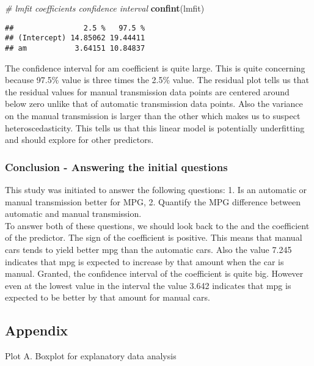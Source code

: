\documentclass[]{article}
\newenvironment{Shaded}{\begin{snugshade}}{\end{snugshade}}
\newcommand{\KeywordTok}[1]{\textcolor[rgb]{0.13,0.29,0.53}{\textbf{#1}}}
\newcommand{\CommentTok}[1]{\textcolor[rgb]{0.56,0.35,0.01}{\textit{#1}}}
\newcommand{\NormalTok}[1]{#1}
\begin{document}
\begin{Shaded}
\begin{Highlighting}[]
\CommentTok{# lmfit coefficients confidence interval}
\KeywordTok{confint}\NormalTok{(lmfit)}
\end{Highlighting}
\end{Shaded}

\begin{verbatim}
##                2.5 %   97.5 %
## (Intercept) 14.85062 19.44411
## am           3.64151 10.84837
\end{verbatim}

The confidence interval for am coefficient is quite large. This is quite
concerning because 97.5\% value is three times the 2.5\% value. The
residual plot tells us that the residual values for manual transmission
data points are centered around below zero unlike that of automatic
transmission data points. Also the variance on the manual transmission
is larger than the other which makes us to suspect heteroscedasticity.
This tells us that this linear model is potentially underfitting and
should explore for other predictors.

\subsubsection{Conclusion - Answering the initial
questions}\label{conclusion---answering-the-initial-questions}

This study was initiated to answer the following questions: 1. Is an
automatic or manual transmission better for MPG, 2. Quantify the MPG
difference between automatic and manual transmission.\\
To answer both of these questions, we should look back to the and the
coefficient of the predictor. The sign of the coefficient is positive.
This means that manual cars tends to yield better mpg than the automatic
cars. Also the value 7.245 indicates that mpg is expected to increase by
that amount when the car is manual. Granted, the confidence interval of
the coefficient is quite big. However even at the lowest value in the
interval the value 3.642 indicates that mpg is expected to be better by
that amount for manual cars.

\subsection{Appendix}\label{appendix}

Plot A. Boxplot for explanatory data analysis
\end{document}
